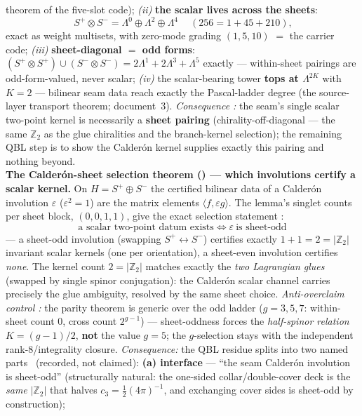 \documentclass[11pt,a4paper]{article}
\newcommand{\cthree}{c_3}
\newcommand{\Z}{\mathbb{Z}}
\theoremstyle{definition}
\begin{document}
\begin{keybox}
theorem of the five-slot code); \emph{(ii)} \textbf{the scalar lives across the sheets}:
\[
  \boxed{\ S^+\!\otimes S^-=\Lambda^0\oplus\Lambda^2\oplus\Lambda^4\ }\quad(256=1+45+210),
\]
exact as weight multisets, with zero-mode grading $(1,5,10)$ $=$ the carrier code; \emph{(iii)}
\textbf{sheet-diagonal $=$ odd forms}: $(S^+\!\otimes S^+)\cup(S^-\!\otimes S^-)=2\Lambda^1+2\Lambda^3+\Lambda^5$
exactly --- within-sheet pairings are odd-form-valued, never scalar; \emph{(iv)} the scalar-bearing tower
\textbf{tops at $\Lambda^{2K}$} with $K=2$ --- bilinear seam data reach exactly the Pascal-ladder degree
(the source-layer transport theorem; document~3). \emph{Consequence \mC:} the seam's single scalar two-point kernel is necessarily a
\textbf{sheet pairing} (chirality-off-diagonal --- the same $\Z_2$ as the glue chiralities and the
branch-kernel selection); the remaining QBL step is to show the Calder\'on kernel supplies exactly this
pairing and nothing beyond.
\smallskip\\
\noindent\textbf{The Calder\'on-sheet selection theorem () --- which
involutions certify a scalar kernel.} On $H=S^+\!\oplus S^-$ the certified bilinear data of a Calder\'on
involution $\varepsilon$ ($\varepsilon^2=1$) are the matrix elements $\langle f,\varepsilon g\rangle$.
The lemma's singlet counts per sheet block, $(0,0,1,1)$, give the exact selection statement \mE:
\[
  \boxed{\ \text{a scalar two-point datum exists}\iff\varepsilon\ \text{is sheet-odd}\ }
\]
--- a sheet-odd involution (swapping $S^+\!\leftrightarrow S^-$) certifies exactly $1+1=2=|\Z_2|$
invariant scalar kernels (one per orientation), a sheet-even involution certifies \emph{none}. The
kernel count $2=|\Z_2|$ matches exactly the \emph{two Lagrangian glues} (swapped by single spinor
conjugation): the Calder\'on scalar channel carries precisely the glue ambiguity, resolved by the same
sheet choice. \emph{Anti-overclaim control \mE:} the parity theorem is generic over the odd ladder
($g=3,5,7$: within-sheet count $0$, cross count $2^{g-1}$) --- sheet-oddness forces the
\emph{half-spinor relation} $K=(g-1)/2$, \textbf{not} the value $g=5$; the $g$-selection stays with the
independent rank-$8$/integrality closure. \emph{Consequence:} the QBL residue splits into two named
parts \mC\ (recorded, not claimed): \textbf{(a) interface} --- ``the seam Calder\'on involution is
sheet-odd'' (structurally natural: the one-sided collar/double-cover deck is the \emph{same} $|\Z_2|$
that halves $\cthree=\tfrac12(4\pi)^{-1}$, and exchanging cover sides is sheet-odd by construction);

\end{keybox}
\end{document}
